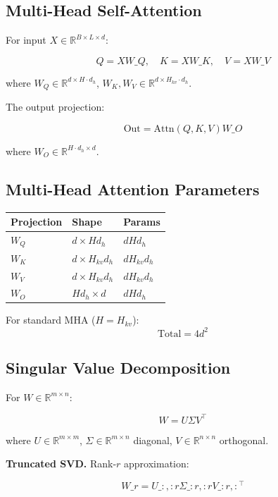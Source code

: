 \subsection{Multi-Head Self-Attention}

For input $X \in \mathbb{R}^{B \times L \times d}$:

\[
Q = X W\_Q, \quad K = X W\_K, \quad V = X W\_V
\]

where $W_Q \in \mathbb{R}^{d \times H \cdot d_h}$, $W_K, W_V \in \mathbb{R}^{d \times H_{kv} \cdot d_h}$.

The output projection:

\[
\text{Out} = \text{Attn}(Q, K, V) W\_O
\]

where $W_O \in \mathbb{R}^{H \cdot d_h \times d}$.

\subsection{Multi-Head Attention Parameters}

\begin{table}[H]
\centering
\small
\begin{tabular}{lll}
\toprule
\textbf{Projection} & \textbf{Shape} & \textbf{Params} \\
\midrule
$W_Q$ & $d \times H d_h$ & $d H d_h$ \\
$W_K$ & $d \times H_{kv} d_h$ & $d H_{kv} d_h$ \\
$W_V$ & $d \times H_{kv} d_h$ & $d H_{kv} d_h$ \\
$W_O$ & $H d_h \times d$ & $d H d_h$ \\
\bottomrule
\end{tabular}
\end{table}

For standard MHA ($H = H_{kv}$):
\[
\text{Total} = 4 d^2
\]

\subsection{Singular Value Decomposition}

For $W \in \mathbb{R}^{m \times n}$:

\[
W = U \Sigma V^\top
\]

where $U \in \mathbb{R}^{m \times m}$, $\Sigma \in \mathbb{R}^{m \times n}$ diagonal, 
$V \in \mathbb{R}^{n \times n}$ orthogonal.

\textbf{Truncated SVD.} Rank-$r$ approximation:

\[
W\_r = U\_{:, :r} \Sigma\_{:r, :r} V\_{:r, :}^\top
\]

